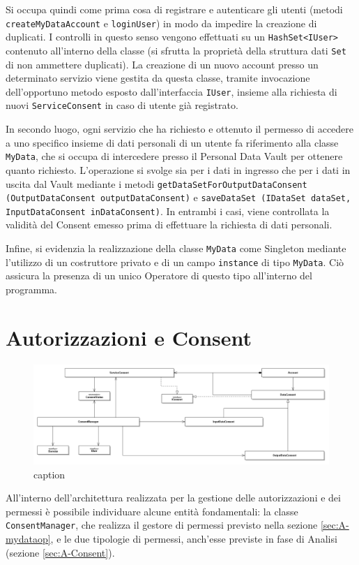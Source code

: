 Si occupa quindi come prima cosa di registrare e autenticare gli utenti (metodi \texttt{createMyDataAccount} e \texttt{loginUser}) in modo da impedire la creazione di duplicati. I controlli in questo senso vengono effettuati su un \texttt{HashSet<IUser>} contenuto all’interno della classe (si sfrutta la propriet\`a della struttura dati \texttt{Set} di non ammettere duplicati). La creazione di un nuovo account presso un determinato servizio viene gestita da questa classe, tramite invocazione dell’opportuno metodo esposto dall’interfaccia \texttt{IUser}, insieme alla richiesta di nuovi \texttt{ServiceConsent} in caso di utente gi\`a registrato.

In secondo luogo, ogni servizio che ha richiesto e ottenuto il permesso di accedere a uno specifico insieme di dati personali di un utente fa riferimento alla classe \texttt{MyData}, che si occupa di intercedere presso il Personal Data Vault per ottenere quanto richiesto. L’operazione si svolge sia per i dati in ingresso che per i dati in uscita dal Vault mediante i metodi \texttt{getDataSetForOutputDataConsent (OutputDataConsent outputDataConsent)} e \texttt{saveDataSet (IDataSet dataSet, InputDataConsent inDataConsent)}. In entrambi i casi, viene controllata la validit\`a del Consent emesso prima di effettuare la richiesta di dati personali.

Infine, si evidenzia la realizzazione della classe \texttt{MyData} come Singleton mediante l’utilizzo di un costruttore privato e di un campo \texttt{instance} di tipo \texttt{MyData}. Ci\`o assicura la presenza di un unico Operatore di questo tipo all’interno del programma.

\section{Autorizzazioni e Consent}
\label{sec:P-AutorizzazioniEConsent}
\begin{figure} [h]
\includegraphics[width=\linewidth]{pictures/Auth-closed.png}
\caption{caption}
\label{fig:Auth-closed}
\end{figure}
All'interno dell'architettura realizzata per la gestione delle autorizzazioni e dei permessi \`e possibile individuare alcune entit\`a fondamentali: la classe \texttt{ConsentManager}, che realizza il gestore di permessi previsto nella sezione \ref{sec:A-mydataop}, e le due tipologie di permessi, anch’esse previste in fase di Analisi (sezione \ref{sec:A-Consent}).

